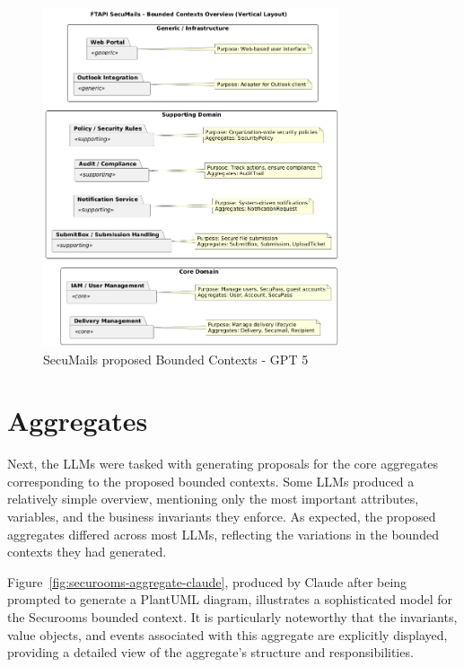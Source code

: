 \begin{figure}[htbp]
  \centering
  \includegraphics[height=10cm]{figures/secumails-bounded-context-chatgpt.png} 
  \caption{SecuMails proposed Bounded Contexts - GPT 5}
  \label{fig:secumails-bounded-contexts-gpt} 
\end{figure}



\section{Aggregates}

Next, the LLMs were tasked with generating proposals for the core aggregates corresponding to the proposed bounded contexts. Some LLMs produced a relatively simple overview, mentioning only the most important attributes, variables, and the business invariants they enforce. As expected, the proposed aggregates differed across most LLMs, reflecting the variations in the bounded contexts they had generated.  

Figure~\ref{fig:securooms-aggregate-claude}, produced by Claude after being prompted to generate a PlantUML diagram, illustrates a sophisticated model for the Securooms bounded context. It is particularly noteworthy that the invariants, value objects, and events associated with this aggregate are explicitly displayed, providing a detailed view of the aggregate's structure and responsibilities.  

